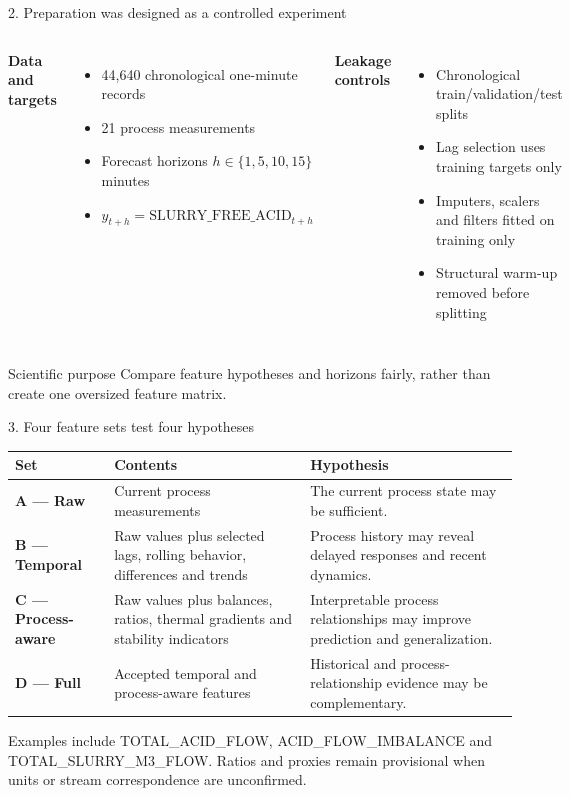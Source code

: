 \documentclass[10pt,aspectratio=169]{beamer}
\newcommand{\smallnote}[1]{{\scriptsize\color{Gray}#1}}
\begin{document}
\begin{frame}{2. Preparation was designed as a controlled experiment}
  \begin{columns}[T,onlytextwidth]
      \textbf{Data and targets}
      \begin{itemize}
        \item 44,640 chronological one-minute records
        \item 21 process measurements
        \item Forecast horizons $h\in\{1,5,10,15\}$ minutes
        \item $y_{t+h}=\mathrm{SLURRY\_FREE\_ACID}_{t+h}$
      \end{itemize}
      \textbf{Leakage controls}
      \begin{itemize}
        \item Chronological train/validation/test splits
        \item Lag selection uses training targets only
        \item Imputers, scalers and filters fitted on training only
        \item Structural warm-up removed before splitting
      \end{itemize}
  \end{columns}

  \vspace{0.25cm}
  \begin{block}{Scientific purpose}
    Compare feature hypotheses and horizons fairly, rather than create one oversized feature matrix.
  \end{block}
\end{frame}

\begin{frame}{3. Four feature sets test four hypotheses}
  \small
  \begin{tabular}{>{\bfseries}L{0.15\textwidth}L{0.35\textwidth}L{0.42\textwidth}}
    \toprule
    Set & Contents & Hypothesis \\
    \midrule
    A --- Raw & Current process measurements & The current process state may be sufficient. \\
    B --- Temporal & Raw values plus selected lags, rolling behavior, differences and trends & Process history may reveal delayed responses and recent dynamics. \\
    C --- Process-aware & Raw values plus balances, ratios, thermal gradients and stability indicators & Interpretable process relationships may improve prediction and generalization. \\
    D --- Full & Accepted temporal and process-aware features & Historical and process-relationship evidence may be complementary. \\
    \bottomrule
  \end{tabular}

  \vfill
  \smallnote{Examples include TOTAL\_ACID\_FLOW, ACID\_FLOW\_IMBALANCE and TOTAL\_SLURRY\_M3\_FLOW. Ratios and proxies remain provisional when units or stream correspondence are unconfirmed.}
\end{frame}
\end{document}
